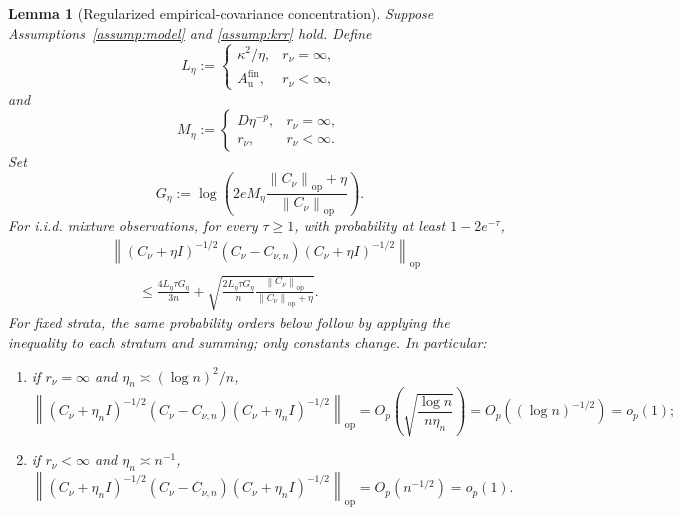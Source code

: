 \documentclass[11pt]{article}
\newtheorem{lemma}{Lemma}[section]
\newcommand{\op}{\mathrm{op}}
\newcommand{\norm}[1]{\left\lVert #1\right\rVert}
\begin{document}
\begin{lemma}[Regularized empirical-covariance concentration]\label{lem:operator_bernstein}
Suppose Assumptions~\ref{assump:model} and \ref{assump:krr} hold. Define
\[
  L_\eta
  :=
  \begin{cases}
    \kappa^2/\eta, & r_\nu=\infty,\\[1mm]
    A_{\mathrm u}^{\mathrm{fin}}, & r_\nu<\infty,
  \end{cases}
\]
and
\[
  M_\eta
  :=
  \begin{cases}
    D\eta^{-p}, & r_\nu=\infty,\\[1mm]
    r_\nu, & r_\nu<\infty.
  \end{cases}
\]
Set
\[
  G_\eta
  :=\log\!\left(
    2eM_\eta\frac{\norm{C_\nu}_{\op}+\eta}{\norm{C_\nu}_{\op}}
  \right).
\]
For i.i.d. mixture observations, for every $\tau\ge1$, with probability at least $1-2e^{-\tau}$,
\begin{align}
  &\norm{(C_\nu+\eta I)^{-1/2}(C_\nu-C_{\nu,n})(C_\nu+\eta I)^{-1/2}}_{\op}
  \nonumber\\
  &\qquad\le
  \frac{4L_\eta\tau G_\eta}{3n}
  +\sqrt{
    \frac{2L_\eta\tau G_\eta}{n}
    \frac{\norm{C_\nu}_{\op}}{\norm{C_\nu}_{\op}+\eta}
  }.
  \label{eq:operator_bernstein}
\end{align}
For fixed strata, the same probability orders below follow by applying the inequality to each stratum and summing; only constants change. In particular:
\begin{enumerate}[label=(\roman*),leftmargin=2.2em]
  \item if $r_\nu=\infty$ and $\eta_n\asymp (\log n)^2/n$,
  \[
    \norm{(C_\nu+\eta_n I)^{-1/2}(C_\nu-C_{\nu,n})(C_\nu+\eta_n I)^{-1/2}}_{\op}
    =
    O_p\!\left(\sqrt{\frac{\log n}{n\eta_n}}\right)
    =O_p\!\left((\log n)^{-1/2}\right)
    =o_p(1);
  \]
  \item if $r_\nu<\infty$ and $\eta_n\asymp n^{-1}$,
  \[
    \norm{(C_\nu+\eta_n I)^{-1/2}(C_\nu-C_{\nu,n})(C_\nu+\eta_n I)^{-1/2}}_{\op}
    =
    O_p(n^{-1/2})
    =o_p(1).
  \]
\end{enumerate}
\end{lemma}
\end{document}
